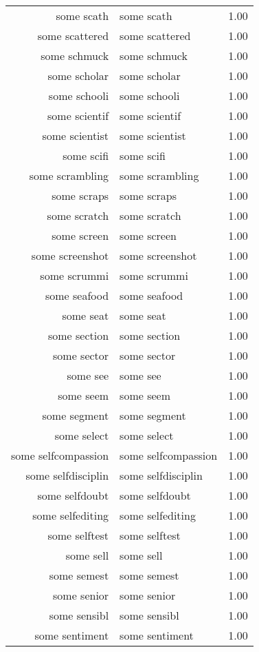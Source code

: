\begin{table}[ht]
\begin{tabular}{rlr}
  some scath & some scath & 1.00 \\ 
  some scattered & some scattered & 1.00 \\ 
  some schmuck & some schmuck & 1.00 \\ 
  some scholar & some scholar & 1.00 \\ 
  some schooli & some schooli & 1.00 \\ 
  some scientif & some scientif & 1.00 \\ 
  some scientist & some scientist & 1.00 \\ 
  some scifi & some scifi & 1.00 \\ 
  some scrambling & some scrambling & 1.00 \\ 
  some scraps & some scraps & 1.00 \\ 
  some scratch & some scratch & 1.00 \\ 
  some screen & some screen & 1.00 \\ 
  some screenshot & some screenshot & 1.00 \\ 
  some scrummi & some scrummi & 1.00 \\ 
  some seafood & some seafood & 1.00 \\ 
  some seat & some seat & 1.00 \\ 
  some section & some section & 1.00 \\ 
  some sector & some sector & 1.00 \\ 
  some see & some see & 1.00 \\ 
  some seem & some seem & 1.00 \\ 
  some segment & some segment & 1.00 \\ 
  some select & some select & 1.00 \\ 
  some selfcompassion & some selfcompassion & 1.00 \\ 
  some selfdisciplin & some selfdisciplin & 1.00 \\ 
  some selfdoubt & some selfdoubt & 1.00 \\ 
  some selfediting & some selfediting & 1.00 \\ 
  some selftest & some selftest & 1.00 \\ 
  some sell & some sell & 1.00 \\ 
  some semest & some semest & 1.00 \\ 
  some senior & some senior & 1.00 \\ 
  some sensibl & some sensibl & 1.00 \\ 
  some sentiment & some sentiment & 1.00 \\ 

\end{tabular}
\end{table}
